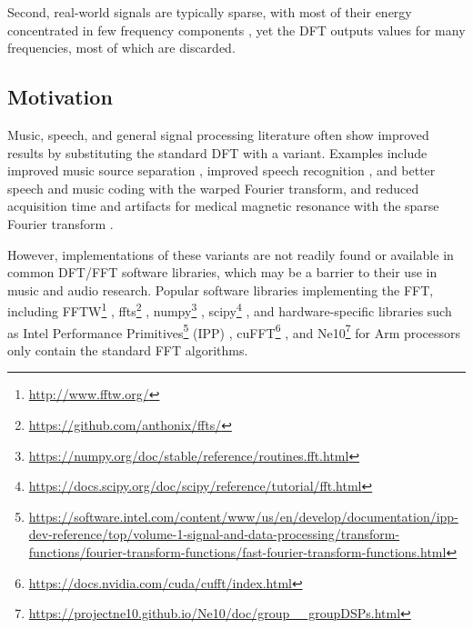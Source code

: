 \documentclass[letter,12pt,notitlepage]{article}
\begin{document}
Second, real-world signals are typically sparse, with most of their energy concentrated in few frequency components \cite{sparseintro}, yet the DFT outputs values for many frequencies, most of which are discarded.

\subsection{Motivation}

Music, speech, and general signal processing literature often show improved results by substituting the standard DFT with a variant. Examples include improved music source separation \cite{betterbss}, improved speech recognition \cite{bettermfcc}, and better speech and music coding \cite{warpedcomparison} with the warped Fourier transform, and reduced acquisition time and artifacts for medical magnetic resonance with the sparse Fourier transform \cite{bettersparse}.

However, implementations of these variants are not readily found or available in common DFT/FFT software libraries, which may be a barrier to their use in music and audio research. Popular software libraries implementing the FFT, including FFTW\footnote{\href{http://www.fftw.org/}{http://www.fftw.org/}} \cite{fftw1}, ffts\footnote{\href{https://github.com/anthonix/ffts/}{https://github.com/anthonix/ffts/}} \cite{ffts}, numpy\footnote{\href{https://numpy.org/doc/stable/reference/routines.fft.html}{https://numpy.org/doc/stable/reference/routines.fft.html}} \cite{numpy}, scipy\footnote{\href{https://docs.scipy.org/doc/scipy/reference/tutorial/fft.html}{https://docs.scipy.org/doc/scipy/reference/tutorial/fft.html}} \cite{scipy}, and hardware-specific libraries such as Intel Performance Primitives\footnote{\href{https://software.intel.com/content/www/us/en/develop/documentation/ipp-dev-reference/top/volume-1-signal-and-data-processing/transform-functions/fourier-transform-functions/fast-fourier-transform-functions.html}{https://software.intel.com/content/www/us/en/develop/documentation/ipp-dev-reference/top/volume-1-signal-and-data-processing/transform-functions/fourier-transform-functions/fast-fourier-transform-functions.html}} (IPP) \cite{ipp}, cuFFT\footnote{\href{https://docs.nvidia.com/cuda/cufft/index.html}{https://docs.nvidia.com/cuda/cufft/index.html}} \cite{cufft}, and Ne10\footnote{\href{https://projectne10.github.io/Ne10/doc/group__groupDSPs.html}{https://projectne10.github.io/Ne10/doc/group\_\_groupDSPs.html}} for Arm processors \cite{ne10} only contain the standard FFT algorithms.
\end{document}
